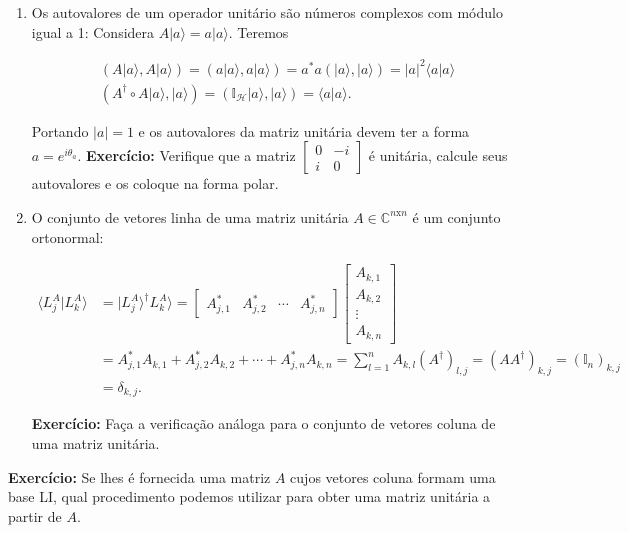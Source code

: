 \documentclass[11pt]{article}
\providecommand{\tightlist}{%
      \setlength{\itemsep}{0pt}\setlength{\parskip}{0pt}}
\begin{document}
\begin{enumerate}
\def\labelenumi{\arabic{enumi}.}
\setcounter{enumi}{1}
\tightlist
\item
  Os autovalores de um operador unitário são números complexos com
  módulo igual a 1: Considera \(A|a\rangle=a|a\rangle\). Teremos

  \begin{align}
  & (A|a\rangle,A|a\rangle) = (a|a\rangle,a|a\rangle) = a^{*}a(|a\rangle,|a\rangle) = |a|^{2}\langle a|a\rangle \\ 
  & (A^{\dagger}\circ A|a\rangle,|a\rangle) = (\mathbb{I}_{\mathcal{H}}|a\rangle,|a\rangle) = \langle a|a\rangle.
  \end{align}

  Portando \(|a|=1\) e os autovalores da matriz unitária devem ter a
  forma \(a=e^{i\theta_{a}}\). \textbf{Exercício:} Verifique que a
  matriz \(\begin{bmatrix} 0 & -i \\ i & 0 \end{bmatrix}\) é unitária,
  calcule seus autovalores e os coloque na forma polar.
\item
  O conjunto de vetores linha de uma matriz unitária
  \(A\in\mathbb{C}^{n\text{x}n}\) é um conjunto ortonormal:

  \begin{align}
  \langle L_{j}^{A}|L_{k}^{A}\rangle & = |L_{j}^{A}\rangle^{\dagger}L_{k}^{A}\rangle  = \begin{bmatrix}A_{j,1}^{*} & A_{j,2}^{*} & \cdots & A_{j,n}^{*}\end{bmatrix}\begin{bmatrix}A_{k,1} \\ A_{k,2} \\ \vdots \\ A_{k,n}\end{bmatrix} \\
  & = A_{j,1}^{*}A_{k,1}+A_{j,2}^{*}A_{k,2}+\cdots+A_{j,n}^{*}A_{k,n} = \sum_{l=1}^{n}A_{k,l}(A^{\dagger})_{l,j} = (AA^{\dagger})_{k,j} = (\mathbb{I}_{n})_{k,j} \\ 
  & = \delta_{k,j}.
  \end{align}

  \textbf{Exercício:} Faça a verificação análoga para o conjunto de
  vetores coluna de uma matriz unitária.
\end{enumerate}

\textbf{Exercício:} Se lhes é fornecida uma matriz \(A\) cujos vetores
coluna formam uma base LI, qual procedimento podemos utilizar para obter
uma matriz unitária a partir de \(A\).


    
    
    
    
\end{document}
